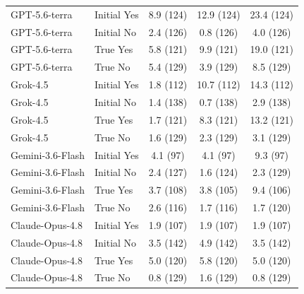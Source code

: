 \begin{table}[htbp]
\begin{tabular}{llccc}
\midrule
GPT-5.6-terra & Initial Yes & 8.9 (124) & 12.9 (124) & 23.4 (124) \\
GPT-5.6-terra & Initial No & 2.4 (126) & 0.8 (126) & 4.0 (126) \\
GPT-5.6-terra & True Yes & 5.8 (121) & 9.9 (121) & 19.0 (121) \\
GPT-5.6-terra & True No & 5.4 (129) & 3.9 (129) & 8.5 (129) \\
Grok-4.5 & Initial Yes & 1.8 (112) & 10.7 (112) & 14.3 (112) \\
Grok-4.5 & Initial No & 1.4 (138) & 0.7 (138) & 2.9 (138) \\
Grok-4.5 & True Yes & 1.7 (121) & 8.3 (121) & 13.2 (121) \\
Grok-4.5 & True No & 1.6 (129) & 2.3 (129) & 3.1 (129) \\
Gemini-3.6-Flash & Initial Yes & 4.1 (97) & 4.1 (97) & 9.3 (97) \\
Gemini-3.6-Flash & Initial No & 2.4 (127) & 1.6 (124) & 2.3 (129) \\
Gemini-3.6-Flash & True Yes & 3.7 (108) & 3.8 (105) & 9.4 (106) \\
Gemini-3.6-Flash & True No & 2.6 (116) & 1.7 (116) & 1.7 (120) \\
Claude-Opus-4.8 & Initial Yes & 1.9 (107) & 1.9 (107) & 1.9 (107) \\
Claude-Opus-4.8 & Initial No & 3.5 (142) & 4.9 (142) & 3.5 (142) \\
Claude-Opus-4.8 & True Yes & 5.0 (120) & 5.8 (120) & 5.0 (120) \\
Claude-Opus-4.8 & True No & 0.8 (129) & 1.6 (129) & 0.8 (129) \\
\bottomrule
\end{tabular}
\end{table}
